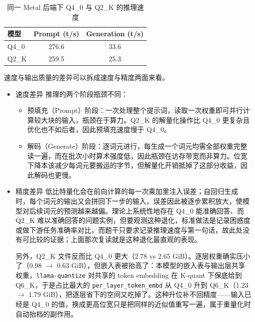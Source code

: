 \documentclass[a4paper, 12pt, linespread=1.35]{ctexart}   %
\begin{document}
\begin{table}[H]
  \centering
  \small
  \caption{同一 Metal 后端下 Q4\_0 与 Q2\_K 的推理速度}
  \label{tab:speed-q2k}
  \begin{tabular}{@{}lcc@{}}
    \toprule
    模型 & Prompt (t/s) & Generation (t/s) \\
    \midrule
    Q4\_0 & 276.6 & 33.6 \\
    Q2\_K & 259.5 & 25.3 \\
    \bottomrule
  \end{tabular}
\end{table}

速度与输出质量的差异可以拆成速度与精度两面来看。
\begin{itemize}
\item 速度差异
推理的两个阶段瓶颈不同：
\begin{itemize}
  \item 预填充（Prompt）阶段：一次处理整个提示词，读取一次权重即可并行计算较大块的输入，瓶颈在于算力。Q2\_K 的解量化操作比 Q4\_0 更复杂且优化也不如后者，因此预填充速度慢于 Q4\_0。
  \item 解码（Generate）阶段：逐词元进行，每生成一个词元均需全部权重完整读一遍，而在批次小时算术强度低，因此瓶颈在访存带宽而非算力。位宽下降本该减少每词元要搬运的字节，但解量化开销抵掉了这部分收益，因此解码也更慢。
\end{itemize}

\item 精度差异
低比特量化会在前向计算的每一次乘加里注入误差；自回归生成时，每个词元的输出又会拼回下一步的输入，误差因此被逐步累积放大，使模型对后续词元的预测越来越偏。理论上系统性地存在 Q4\_0 能准确回答、而 Q2\_K 难以准确回答的问题实例，但要观测这种退化，标准做法是记录困惑度或做下游任务准确率对比，而题干只要求记录推理速度与第一句话，故此处没有可比较的证据；上面那次复读就是这种退化最直观的表现。

另外，Q2\_K 文件反而比 Q4\_0 更大（2.78 vs 2.65 GiB）。逐层权重确实压小了（0.98 $\rightarrow$ 0.63 GiB），但嵌入表被抬高了：本模型的嵌入表与输出层共享权重，\texttt{llama-quantize} 对共享的 token embedding 在 K-quant 下保底给到 Q6\_K，于是占比最大的 \texttt{per\_layer\_token\_embd} 从 Q4\_0 升到 Q6\_K（1.23 $\rightarrow$ 1.79 GiB），把逐层省下的空间又吃掉了。这种升位补不回精度——输入已经是 Q4\_0 的值，换成更高位宽只是把同样的近似值重写一遍，属于重量化时自动抬档的副作用。
\end{itemize}
\end{document}
